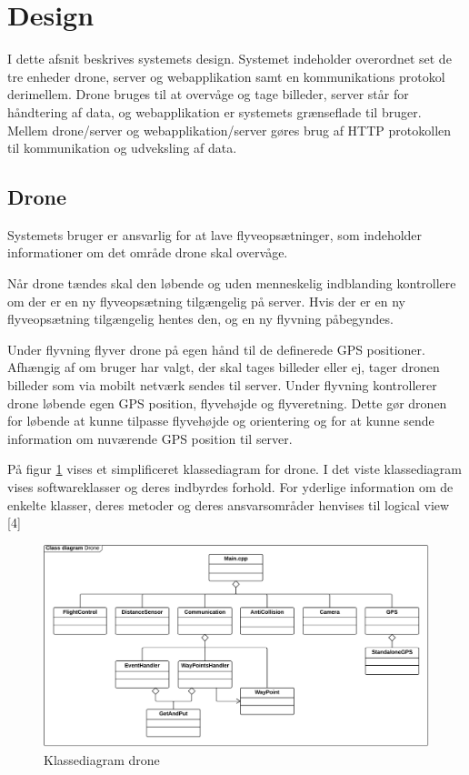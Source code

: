 \section{Design}

I dette afsnit beskrives systemets design. Systemet indeholder overordnet set de tre enheder drone, server og webapplikation samt en kommunikations protokol derimellem. Drone bruges til at overvåge og tage billeder, server står for håndtering af data, og webapplikation er systemets grænseflade til bruger. Mellem drone/server og webapplikation/server gøres brug af HTTP protokollen til kommunikation og udveksling af data.



\subsection{Drone}

Systemets bruger er ansvarlig for at lave flyveopsætninger, som indeholder informationer om det område drone skal overvåge.

Når drone tændes skal den løbende og uden menneskelig indblanding kontrollere om der er en ny flyveopsætning tilgængelig på server. Hvis der er en ny flyveopsætning tilgængelig hentes den, og en ny flyvning påbegyndes. 

Under flyvning flyver drone på egen hånd til de definerede GPS positioner. Afhængig af om bruger har valgt, der skal tages billeder eller ej, tager dronen billeder som via mobilt netværk sendes til server. 
Under flyvning kontrollerer drone løbende egen GPS position, flyvehøjde og flyveretning. Dette gør dronen for løbende at kunne tilpasse flyvehøjde og orientering og for at kunne sende information om nuværende GPS position til server.

På figur \ref{fig:class_drone} vises et simplificeret klassediagram for drone. I det viste klassediagram vises softwareklasser og deres indbyrdes forhold. For yderlige information om de enkelte klasser, deres metoder og deres ansvarsområder henvises til logical view [4]

\begin{figure}[H]
\centering
\includegraphics[width=1\textwidth]{Billeder/Design_Class_drone.png}
\vspace{-0.5cm}
\caption{Klassediagram drone}
\label{fig:class_drone}
\end{figure}


